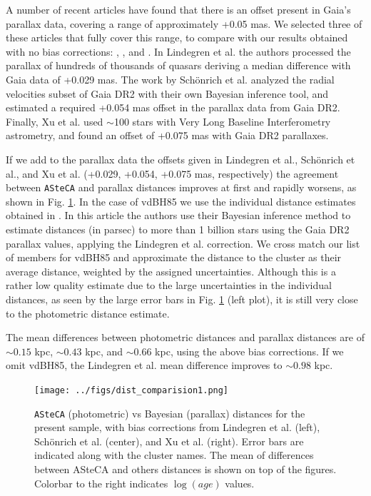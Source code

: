 \documentclass[draft]{aa}
\begin{document}
A number of recent articles have found that there is an offset present in
Gaia's parallax data, covering a range of approximately +0.05 mas. We selected
three of these articles that fully cover this range, to compare with our
results obtained with no bias corrections: \cite{Lindegren_2018},
\cite{Schonrich2019}, and \cite{Xu_2019}.
%
In Lindegren et al. the authors processed the parallax of hundreds of
thousands of quasars deriving a median difference with Gaia data of +0.029 mas.
The work by Sch\"onrich et al. analyzed the radial velocities subset of Gaia
DR2 with their own Bayesian inference tool, and estimated a required +0.054 mas
offset in the parallax data from Gaia DR2. Finally, Xu et al. used $\sim$100
stars with Very Long Baseline Interferometry astrometry, and found an offset of
+0.075 mas with Gaia DR2 parallaxes. 

If we add to the parallax data the offsets given in Lindegren et al., 
Sch\"onrich et al., and Xu et al. (+0.029, +0.054, +0.075 mas,
respectively) the agreement between \texttt{ASteCA} and parallax distances
improves at first and rapidly worsens, as shown in Fig. \ref{fig:prlxbias}.
%
In the case of vdBH85 we use the individual distance estimates obtained
in \cite{BailerJones_2018}. In this article the authors use their Bayesian
inference method to estimate distances (in parsec) to more than 1 billion stars
using the Gaia DR2 parallax values, applying the Lindegren et al. correction.
We cross match our list of members for vdBH85 and approximate the distance to
the cluster as their average distance, weighted by the assigned uncertainties.
Although this is a rather low quality estimate due to the large
uncertainties in the individual distances, as seen by the large error bars
in Fig. \ref{fig:prlxbias} (left plot), it is still very close to the
photometric distance estimate.

The mean differences between photometric distances and parallax distances are
of $\sim0.15$ kpc, $\sim0.43$ kpc, and $\sim0.66$ kpc, using the above bias
corrections. If we omit vdBH85, the Lindegren et al. mean difference improves
to $\sim0.98$ kpc.\\

\begin{figure}[ht]
    \centering
    \texttt{[image: ../figs/dist\_comparision1.png]}
    \caption{\texttt{ASteCA} (photometric) vs Bayesian (parallax) distances for
    the present sample, with bias corrections from Lindegren et al. (left),
    Sch\"onrich et al. (center), and Xu et al. (right). Error bars are
    indicated along with the cluster names. The mean of differences between
    ASteCA and others distances is shown on top of the figures. Colorbar to
    the right indicates $\log(age)$ values.}
    \label{fig:prlxbias}
\end{figure}
\end{document}
